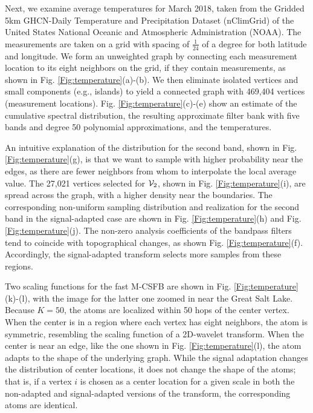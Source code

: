 \documentclass[journal, 10pt]{IEEEtran}
\begin{document}
Next, we examine average temperatures for March 2018, taken from the Gridded 5km GHCN-Daily Temperature and Precipitation Dataset (nClimGrid) \cite{nClimGrid1,nClimGrid2} of the United States National Oceanic and Atmospheric Administration (NOAA). The measurements are taken on a grid with spacing of $\frac{1}{24}$ of a degree for both latitude and longitude. We form an unweighted graph by connecting each measurement location to its eight neighbors on the grid, if they contain measurements, as shown in Fig. \ref{Fig:temperature}(a)-(b). We then eliminate isolated vertices and small components (e.g., islands) to yield a connected graph with 469,404 vertices (measurement locations). Fig. \ref{Fig:temperature}(c)-(e) show an estimate of the cumulative spectral distribution, %
the resulting approximate filter bank with five bands and degree 50 polynomial approximations, and the temperatures. %




An intuitive explanation of the distribution for the second band, %
 shown in Fig. \ref{Fig:temperature}(g), is that we want to sample with higher probability near the edges, as there are fewer neighbors from whom to interpolate the local average value. The 27,021 vertices selected for ${\mathcal{V}}_2$, shown in Fig. \ref{Fig:temperature}(i), are spread across the graph, with a higher density near the boundaries. The corresponding non-uniform sampling distribution and realization for the second band in the signal-adapted case are shown in Fig. \ref{Fig:temperature}(h) and Fig. \ref{Fig:temperature}(j). The non-zero analysis coefficients of the bandpass filters tend to coincide with topographical changes, as shown Fig. \ref{Fig:temperature}(f). Accordingly, the signal-adapted transform selects more samples from these regions.


Two scaling functions for the fast M-CSFB are shown in Fig. \ref{Fig:temperature}(k)-(l), with the image for the latter one zoomed in near the Great Salt Lake. Because $K=50$, the atoms are localized within 50 hops of the center vertex. When the center is in a region where each vertex has eight neighbors, the atom is symmetric, resembling the scaling function of a 2D-wavelet transform. When the center is near an edge, like the one shown in Fig. \ref{Fig:temperature}(l), the atom adapts to the shape of the underlying graph. While %
the signal adaptation changes the distribution of center locations, it does not change the shape of the atoms; that is, if a vertex $i$ is chosen as a center location for a given scale in both the non-adapted and signal-adapted versions of the transform, the corresponding atoms are identical. 
\end{document}
